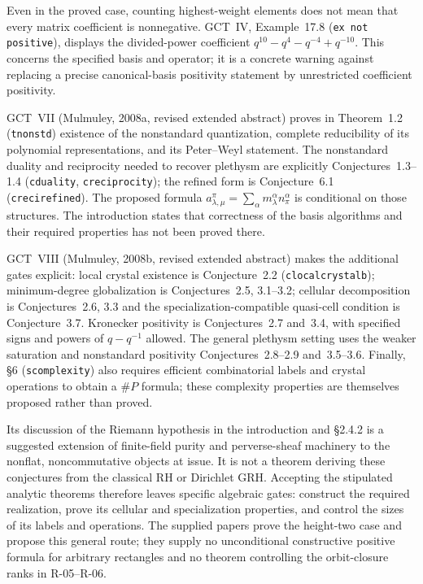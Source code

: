 Even in the proved case, counting highest-weight elements does not
mean that every matrix coefficient is nonnegative. GCT~IV,
Example~17.8 (\texttt{ex not positive}), displays the divided-power
coefficient $q^{10}-q^4-q^{-4}+q^{-10}$. This concerns the specified
basis and operator; it is a concrete warning against replacing a
precise canonical-basis positivity statement by unrestricted
coefficient positivity.

GCT~VII (Mulmuley, 2008a, revised extended abstract) proves in
Theorem~1.2 (\texttt{tnonstd}) existence of the nonstandard
quantization, complete reducibility of its polynomial
representations, and its Peter--Weyl statement. The nonstandard
duality and reciprocity needed to recover plethysm are explicitly
Conjectures~1.3--1.4 (\texttt{cduality}, \texttt{creciprocity});
the refined form is Conjecture~6.1 (\texttt{crecirefined}).
The proposed formula
$a_{\lambda,\mu}^{\pi}=\sum_\alpha
m_\lambda^\alpha n_\pi^\alpha$ is conditional on those structures.
The introduction states that correctness of the basis algorithms
and their required properties has not been proved there.

GCT~VIII (Mulmuley, 2008b, revised extended abstract) makes the
additional gates explicit: local crystal existence is Conjecture~2.2
(\texttt{clocalcrystalb}); minimum-degree globalization is
Conjectures~2.5, 3.1--3.2; cellular decomposition is Conjectures~2.6,
3.3 and the specialization-compatible quasi-cell condition is
Conjecture~3.7. Kronecker positivity is Conjectures~2.7 and~3.4,
with specified signs and powers of $q-q^{-1}$ allowed. The general
plethysm setting uses the weaker saturation and nonstandard
positivity Conjectures~2.8--2.9 and~3.5--3.6. Finally, \S6
(\texttt{scomplexity}) also requires efficient combinatorial
labels and crystal operations to obtain a $\#P$ formula; these
complexity properties are themselves proposed rather than proved.

Its discussion of the Riemann hypothesis in the introduction and
\S2.4.2 is a suggested extension of finite-field purity and
perverse-sheaf machinery to the nonflat, noncommutative objects at
issue. It is not a theorem deriving these conjectures from the
classical RH or Dirichlet GRH. Accepting the stipulated analytic
theorems therefore leaves specific algebraic gates: construct the
required realization, prove its cellular and specialization
properties, and control the sizes of its labels and operations.
The supplied papers prove the height-two case and propose this
general route; they supply no unconditional constructive positive
formula for arbitrary rectangles and no theorem controlling the
orbit-closure ranks in R-05--R-06.

